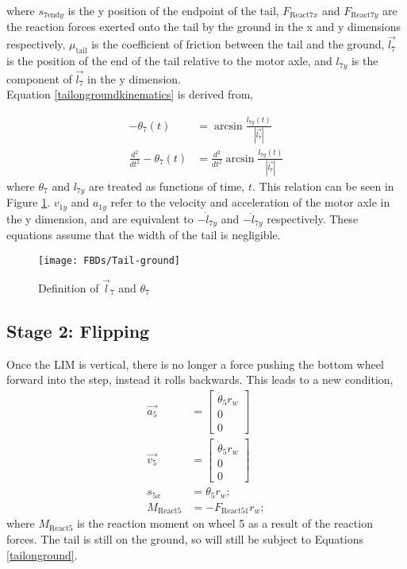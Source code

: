 where $s_{7\mathrm{end}y}$ is the y position of the endpoint of the tail, $F_{\mathrm{React}7x}$ and $F_{\mathrm{React}7y}$ are the reaction forces exerted onto the tail by the ground in the x and y dimensions respectively, $\mu_{\mathrm{tail}}$ is the coefficient of friction between the tail and the ground, $\vec{l_7}$ is the position of the end of the tail relative to the motor axle, and $l_{7y}$ is the component of $\vec{l_7}$ in the y dimension. \\
Equation \ref{tailongroundkinematics} is derived from,

\begin{subequations}
	\begin{align}
		-\theta_7(t) &= \arcsin{\frac{l_{7y}(t)}{|\vec{l_7}|}}\\
		\frac{d^2}{dt^2}-\theta_7(t) &= \frac{d^2}{dt^2}\arcsin{\frac{l_{7y}(t)}{|\vec{l_7}|}}
	\end{align}
\end{subequations}
where $\theta_7$ and $l_{7y}$ are treated as functions of time, $t$. This relation can be seen in Figure \ref{fig:tailGround}. $v_{1y}$ and $a_{1y}$ refer to the velocity and acceleration of the motor axle in the y dimension, and are equivalent to $-\dot{l}_{7y}$ and $-\ddot{l}_{7y}$ respectively. These equations assume that the width of the tail is negligible.\\

\begin{figure}[!h]
	\centering
	\texttt{[image: FBDs/Tail-ground]}
	\caption{Definition of $\vec{l}_7$ and $\theta_7$}
	\label{fig:tailGround}
\end{figure}

\subsection*{Stage 2: Flipping}

Once the LIM is vertical, there is no longer a force pushing the bottom wheel forward into the step, instead it rolls backwards. This leads to a new condition,
\begin{subequations}
	\label{wheel1rolling}
	\begin{align}
		\vec{a_5} &= \begin{bmatrix}
			\ddot{\theta}_5 r_w \\
			0\\
			0
		\end{bmatrix}\\
		\vec{v_5} &= \begin{bmatrix}
			\dot{\theta}_5 r_w \\
			0\\
			0
		\end{bmatrix}\\
		s_{5x} &= \theta_{5} r_w;\\
		M_{\mathrm{React}5} &= - F_{\mathrm{React}51} r_w;
	\end{align}
\end{subequations}
where $M_{\mathrm{React}5}$ is the reaction moment on wheel 5 as a result of the reaction forces.
The tail is still on the ground, so will still be subject to Equations \ref{tailonground}.

